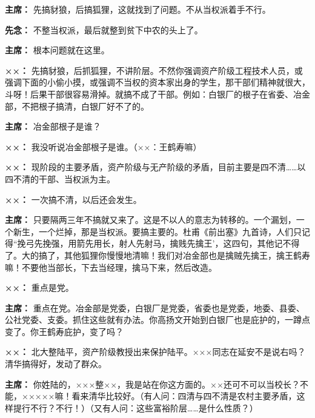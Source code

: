 \begin{duihua}
\item[\textbf{主席：}] 先搞豺狼，后搞狐狸，这就找到了问题。不从当权派着手不行。

\item[\textbf{先念：}] 不整当权派，最后就整到贫下中农的头上了。

\item[\textbf{主席：}] 根本问题就在这里。

\item[\textbf{××：}] 先搞豺狼，后抓狐狸，不讲阶层。不然你强调资产阶级工程技术人员，或强调下面的小偷小摸，或强调不当权的资本家出身的学生，那干部们精神就很大，斗呀！后果干部很容易滑掉。就搞不成了干部。例如：白银厂的根子在省委、冶金部，不把根子搞清，白银厂好不了的。

\item[\textbf{主席：}] 冶金部根子是谁？

\item[\textbf{××：}] 我没听说冶金部根子是谁。（××：王鹤寿嘛）

\item[\textbf{××：}] 现阶段的主要矛盾，资产阶级与无产阶级的矛盾，目前主要是四不清……以四不清的干部、当权派为主。

\item[\textbf{××：}] 一次搞不清，以后还会发生。

\item[\textbf{主席：}] 只要隔两三年不搞就又来了。这是不以人的意志为转移的。一个漏划，一个新生，一个烂掉，那是当权派。要搞主要的。杜甫《前出塞》九首诗，人们只记得“挽弓先挽强，用箭先用长，射人先射马，擒贱先擒王’，这四句，其他记不得了。大的搞了，其他狐狸你慢慢地清嘛！我们对冶金部也是擒贼先擒王，擒王鹤寿嘛！不要他当部长，下去当经理，擒马下来，然后改造。

\item[\textbf{××：}] 重点是党。

\item[\textbf{主席：}] 重点在党。冶金部是党委，白银厂是党委，省委也是党委，地委、县委、公社党委、支委。抓住这些就有办法。你高扬文开始到白银厂也是庇护的，一蹲点变了。你王鹤寿庇护，变了吗？

\item[\textbf{××：}] 北大整陆平，资产阶级教授出来保护陆平。×××同志在延安不是说右吗？清华搞得好，发动了群众。

\item[\textbf{主席：}] 你姓陆的，×××整××，我是站在你这方面的。××还可不可以当校长？不能，×××××嘛！看来清华比较好。（有人问：四清与四不清是农村主要矛盾，这样提行不行？不行！）（又有人问：这些富裕阶层……是什么性质？）


\end{duihua}
